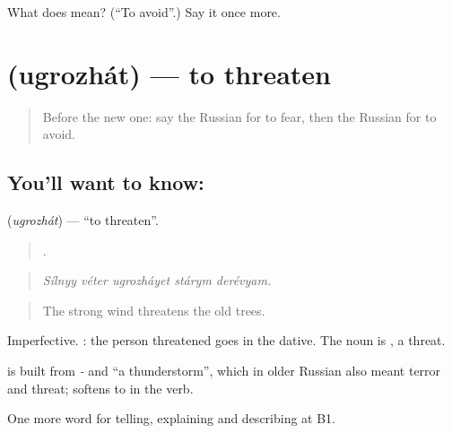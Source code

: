 \begin{tcolorbox}[breakable,colback=teal!4,colframe=teal!35!black,title={Before you move on}]
What does  mean? (\textquotedblleft{}To avoid\textquotedblright{}.) Say it once more.
\end{tcolorbox}
\section[\texorpdfstring{\ru{угрожать} (ugrozhát)}{угрожать (ugrozhát)}]{ (ugrozhát) — to threaten}

\label{lesson:RU-C373-ugrozhat}



\begin{quote}
Before the new one: say the Russian for to fear, then the Russian for to avoid.
\end{quote}

\subsection*{You'll want to know: }
\textbf{} (\emph{ugrozhát}) — \textquotedblleft{}to threaten\textquotedblright{}.

\begin{quote}
    .
\end{quote}

\begin{quote}
\emph{Sílnyy véter ugrozháyet stárym derévyam.}
\end{quote}

\begin{quote}
The strong wind threatens the old trees.
\end{quote}

Imperfective. \emph{  }: the person threatened goes in the dative. The noun is \emph{}, a threat.

\begin{cousinweb}
\textbf{} is built from \emph{-} and \emph{} \textquotedblleft{}a thunderstorm\textquotedblright{}, which in older Russian also meant terror and threat; \emph{} softens to \emph{} in the verb.
\end{cousinweb}

\begin{grammarlens}[title={What you've built}]
One more word for telling, explaining and describing at B1.
\end{grammarlens}

